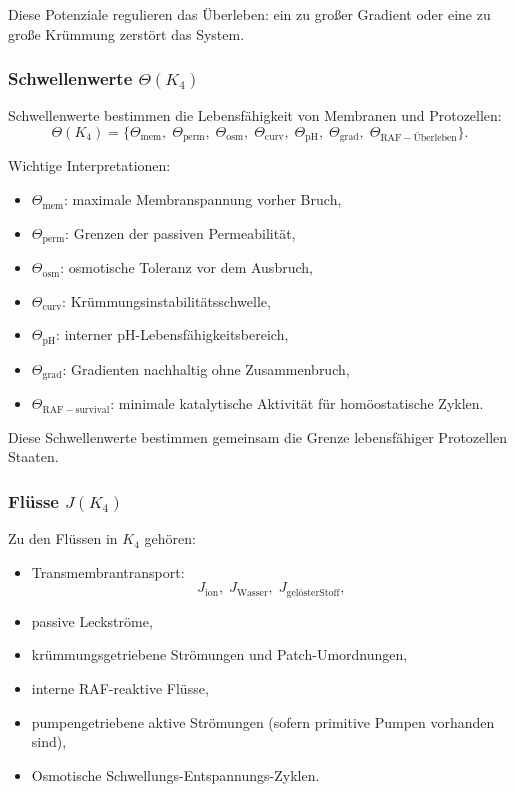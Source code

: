 Diese Potenziale regulieren das Überleben: ein zu großer Gradient oder eine zu große Krümmung
zerstört das System.

\subsubsection{Schwellenwerte \texorpdfstring{$\Theta(K_4)$}{\Theta(K_4)}}

Schwellenwerte bestimmen die Lebensfähigkeit von Membranen und Protozellen:
\[
\Theta(K_4) =
\{\Theta_{\mathrm{mem}},\;
  \Theta_{\mathrm{perm}},\;
  \Theta_{\mathrm{osm}},\;
  \Theta_{\mathrm{curv}},\;
  \Theta_{\mathrm{pH}},\;
  \Theta_{\mathrm{grad}},\;
  \Theta_{\mathrm{RAF-Überleben}}\}.
\]

Wichtige Interpretationen:
\begin{itemize}
    \item $\Theta_{\mathrm{mem}}$: maximale Membranspannung vorher
          Bruch,
    \item $\Theta_{\mathrm{perm}}$: Grenzen der passiven Permeabilität,
    \item $\Theta_{\mathrm{osm}}$: osmotische Toleranz vor dem Ausbruch,
    \item $\Theta_{\mathrm{curv}}$: Krümmungsinstabilitätsschwelle,
    \item $\Theta_{\mathrm{pH}}$: interner pH-Lebensfähigkeitsbereich,
    \item $\Theta_{\mathrm{grad}}$: Gradienten nachhaltig ohne
          Zusammenbruch,
    \item $\Theta_{\mathrm{RAF-survival}}$: minimale katalytische Aktivität
          für homöostatische Zyklen.
\end{itemize}

Diese Schwellenwerte bestimmen gemeinsam die Grenze lebensfähiger Protozellen
Staaten.

\subsubsection{Flüsse \texorpdfstring{$J(K_4)$}{J(K_4)}}

Zu den Flüssen in $K_4$ gehören:
\begin{itemize}
    \item Transmembrantransport:
          \[
          J_{\mathrm{ion}},\; J_{\mathrm{Wasser}},\; J_{\mathrm{gelöster Stoff}},
          \]
    \item passive Leckströme,
    \item krümmungsgetriebene Strömungen und Patch-Umordnungen,
    \item interne RAF-reaktive Flüsse,
    \item pumpengetriebene aktive Strömungen (sofern primitive Pumpen vorhanden sind),
    \item Osmotische Schwellungs-Entspannungs-Zyklen.
\end{itemize}

